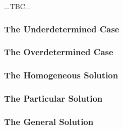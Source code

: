 




...TBC...

\subsubsection{The Underdetermined Case}


\subsubsection{The Overdetermined Case}


\subsubsection{The Homogeneous Solution}


\subsubsection{The Particular Solution}


\subsubsection{The General Solution}




